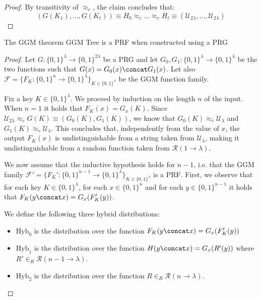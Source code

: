 \documentclass[a4paper, 12pt]{report}
\begin{document}
\begin{proof}
        By transitivity of $\approx_c$, the claim concludes that:
        \[(G(K_1), \ldots, G(K_t)) \equiv H_0 \approx_c \ldots \approx_c H_t \equiv (\mathcal{U}_{2\lambda}, \ldots, \mathcal{U}_{2\lambda})\]
    \end{proof}

    \begin{framedthm}{The GGM theorem}
        GGM Tree is a PRF when constructed using a PRG
    \end{framedthm}

    \begin{proof}
        Let $G : \{0,1\}^\lambda \to \{0,1\}^{2\lambda}$ be a PRG and let $G_0, G_1 : \{0,1\}^\lambda \to \{0,1\}^\lambda$ be the two functions such that $G(x) = G_0(x) \concat G_1(x)$. Let also $\mathcal{F} = \{F_K : \{0,1\}^n \to \{0,1\}^\lambda\}_{K \in \{0,1\}^\lambda}$ be the GGM function family.

        Fix a key $K \in \{0,1\}^\lambda$. We proceed by induction on the length $n$ of the input. When $n = 1$ it holds that $F_K(x) = G_x(K)$. Since $\mathcal{U}_{2\lambda} \approx_c G(K) \equiv (G_0(K), G_1(K))$, we know that $G_0(K) \approx_c \mathcal{U}_\lambda$ and $G_1(K) \approx_c \mathcal{U}_\lambda$. This concludes that, independently from the value of $x$, the output $F_K(x)$ is undistinguishable from a string taken from $\mathcal{U}_\lambda$, making it undistinguishable from a random function taken from $\mathcal{R}(1 \to \lambda)$. 

        We now assume that the inductive hypothesis holds for $n-1$, i.e. that the GGM family $\mathcal{F'} = \{F_K' : \{0,1\}^{n-1} \to \{0,1\}^{\lambda}\}_{K \in \{0,1\}^\lambda}$ is a PRF. First, we observe that for each key $K \in \{0,1\}^\lambda$, for each $x \in \{0,1\}^n$ and for each $y \in \{0,1\}^{n-1}$ it holds that $F_K(y \concat x) = G_{x}(F_K'(y))$.
        
        We define the following three hybrid distributions:
        \begin{itemize}
            \item $\mathrm{Hyb}_0$ is the distribution over the function $F_K(y \concat x) = G_x(F_K'(y))$
            \item $\mathrm{Hyb}_1$ is the distribution over the function $H(y \concat x) = G_x(R'(y))$ where $R' \in_R \mathcal{R}(n-1 \to \lambda)$.
            \item $\mathrm{Hyb}_2$ is the distribution over the function $R \in_R \mathcal{R}(n \to \lambda)$.
        \end{itemize}


\end{proof}
\end{document}

